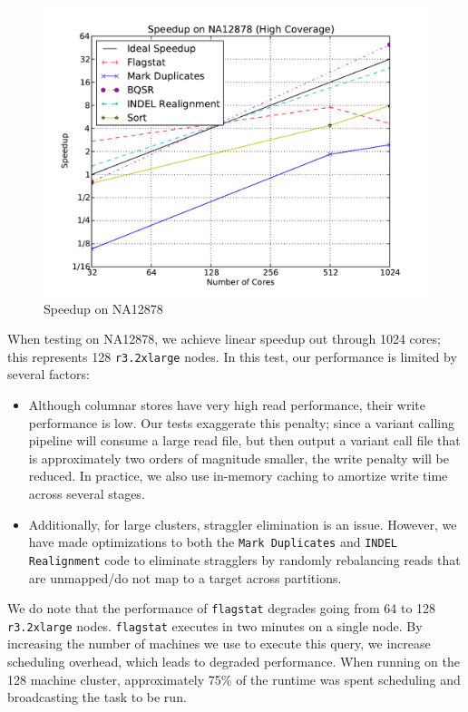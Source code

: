 \documentclass{acm_proc_article-sp}
\begin{document}
\begin{figure}[h]
\begin{center}
\includegraphics[width=0.9\linewidth]{graphs/speedup_na12878.pdf}
\end{center}
\caption{Speedup on NA12878}
\label{fig:speedup}
\end{figure}

When testing on NA12878, we achieve linear speedup out through 1024 cores; this represents 128
\texttt{r3.2xlarge} nodes. In this test, our performance is limited by several factors:

\begin{itemize}
\item Although columnar stores have very high read performance, their write performance is low. Our
tests exaggerate this penalty; since a variant calling pipeline will consume a large read file, but then output a
variant call file that is approximately two orders of magnitude smaller, the write penalty will be reduced. In
practice, we also use in-memory caching to amortize write time across several stages.
\item Additionally, for large clusters, straggler elimination is an issue. However, we have made optimizations to
both the \texttt{Mark Duplicates} and \texttt{INDEL Realignment} code to eliminate stragglers by randomly
rebalancing reads that are unmapped/do not map to a target across partitions.
\end{itemize}

We do note that the performance of \texttt{flagstat} degrades going from 64 to 128 \texttt{r3.2xlarge} nodes.
\texttt{flagstat} executes in two minutes on a single node. By increasing the number of machines
we use to execute this query, we increase scheduling overhead, which leads to degraded
performance. When running on the 128 machine cluster, approximately 75\% of the runtime was spent
scheduling and broadcasting the task to be run.
\end{document}
